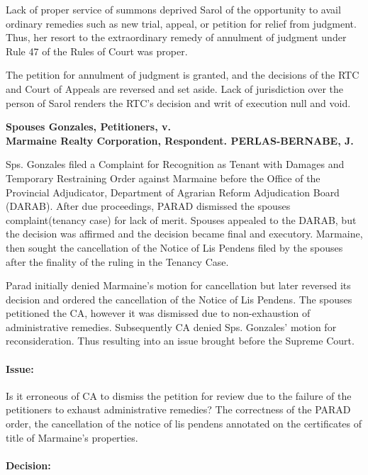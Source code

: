 \documentclass[
12pt,
oneside,
onehalfspacing,
headsepline
]{DigestCollection}
\begin{document}
Lack of proper service of summons deprived Sarol of the opportunity to avail ordinary remedies such as new trial, appeal, or petition for relief from judgment. Thus, her resort to the extraordinary remedy of annulment of judgment under Rule 47 of the Rules of Court was proper.

The petition for annulment of judgment is granted, and the decisions of the RTC and Court of Appeals are reversed and set aside. Lack of jurisdiction over the person of Sarol renders the RTC's decision and writ of execution null and void.



\noindent\textbf{Spouses Gonzales, Petitioners, v. \\Marmaine Realty Corporation, Respondent. PERLAS-BERNABE, J.}\vspace{0.4cm}

Sps. Gonzales filed a Complaint for Recognition as Tenant with Damages and Temporary Restraining Order against Marmaine before the Office of the Provincial Adjudicator, Department of Agrarian Reform Adjudication Board (DARAB). After due proceedings, PARAD dismissed the spouses complaint(tenancy case) for lack of merit. Spouses appealed to the DARAB, but the decision was affirmed and the decision became final and executory. Marmaine, then sought the cancellation of the Notice of Lis Pendens filed by the spouses after the finality of the ruling in the Tenancy Case.

Parad initially denied Marmaine's motion for cancellation but later reversed its decision and ordered the cancellation of the Notice of Lis Pendens. The spouses petitioned the CA, however it was dismissed due to non-exhaustion of administrative remedies. Subsequently CA denied Sps. Gonzales' motion for reconsideration. Thus resulting into an issue brought before the Supreme Court.

\paragraph{Issue:}


Is it erroneous of CA to dismiss the petition for review due to the failure of the petitioners to exhaust administrative remedies? The correctness of the PARAD order, the cancellation of the notice of lis pendens annotated on the certificates of title of Marmaine's properties.

\paragraph{Decision:}
\end{document}
